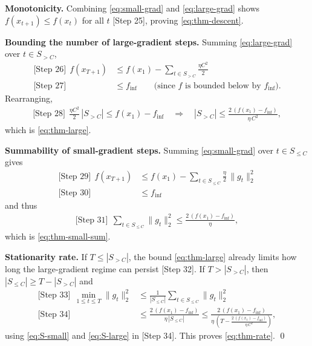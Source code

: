 \documentclass[11pt]{article}
\begin{document}
\noindent
\textbf{Monotonicity.}
Combining \eqref{eq:small-grad} and \eqref{eq:large-grad} shows $f(x_{t+1})\le f(x_t)$ for all $t$ [Step 25], proving \eqref{eq:thm-descent}.

\noindent
\textbf{Bounding the number of large-gradient steps.}
Summing \eqref{eq:large-grad} over $t\in S_{>C}$,
\begin{align}
\text{[Step 26]}\ \ f(x_{T+1})
&\le f(x_1) - \sum_{t\in S_{>C}} \frac{\eta C^2}{2} \nonumber\\
\text{[Step 27]}\ \ 
&\le f_\inf \qquad \text{(since $f$ is bounded below by $f_\inf$).} \nonumber
\end{align}
Rearranging,
\begin{align}
\text{[Step 28]}\ \ \frac{\eta C^2}{2}\,|S_{>C}| \le f(x_1)-f_\inf
\quad\Rightarrow\quad
|S_{>C}| \le \frac{2\,(f(x_1)-f_\inf)}{\eta\, C^2}, \label{eq:S-large}
\end{align}
which is \eqref{eq:thm-large}.

\noindent
\textbf{Summability of small-gradient steps.}
Summing \eqref{eq:small-grad} over $t\in S_{\le C}$ gives
\begin{align}
\text{[Step 29]}\ \ f(x_{T+1})
&\le f(x_1) - \sum_{t\in S_{\le C}} \frac{\eta}{2}\,\|g_t\|_2^2 \nonumber\\
\text{[Step 30]}\ \ 
&\le f_\inf \nonumber
\end{align}
and thus
\begin{align}
\text{[Step 31]}\ \ \sum_{t\in S_{\le C}} \|g_t\|_2^2 \le \frac{2\,(f(x_1)-f_\inf)}{\eta}, \label{eq:S-small}
\end{align}
which is \eqref{eq:thm-small-sum}.

\noindent
\textbf{Stationarity rate.}
If $T \le |S_{>C}|$, the bound \eqref{eq:thm-large} already limits how long the large-gradient regime can persist [Step 32]. If $T > |S_{>C}|$, then $|S_{\le C}|\ge T - |S_{>C}|$ and
\begin{align}
\text{[Step 33]}\ \ \min_{1\le t\le T} \|g_t\|_2^2
&\le \frac{1}{|S_{\le C}|} \sum_{t\in S_{\le C}} \|g_t\|_2^2 \nonumber\\
\text{[Step 34]}\ \ 
&\le \frac{2\,(f(x_1)-f_\inf)}{\eta\, |S_{\le C}|}
\le \frac{2\,(f(x_1)-f_\inf)}{\eta\, \left(T - \frac{2\,(f(x_1)-f_\inf)}{\eta\, C^2}\right)}, \label{eq:rate-final}
\end{align}
using \eqref{eq:S-small} and \eqref{eq:S-large} in [Step 34]. This proves \eqref{eq:thm-rate}. \qed
\end{document}
